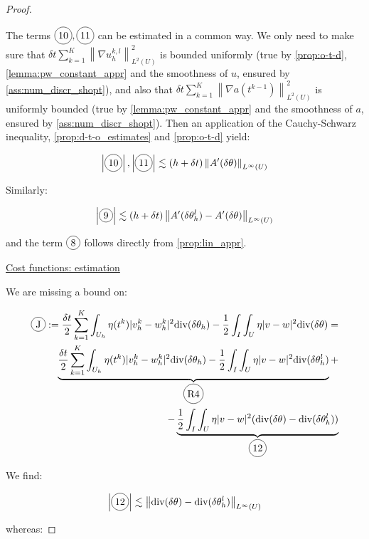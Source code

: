 \documentclass[english,a4paper,10pt,oneside]{scrbook}	%
\theoremstyle{break}
\newenvironment{mproof}[1][\proofname]{%
  \begin{proof}[#1]$ $\par\nobreak\ignorespaces
}{%
  \end{proof}
}
\renewcommand*{\proofname}{Proof}
\theoremstyle{remark}
\newcommand{\ds}{\displaystyle}
\newcommand{\norm}[1]{\left\lVert#1\right\rVert}
\newcommand{\te}{\theta}
\newcommand{\dive}{\text{div}}
\newcommand*\circled[1]{\tikz[baseline=(char.base)]{
            \node[shape=circle,draw,inner sep=2pt] (char) {#1};}}
\begin{document}
\begin{mproof}
The terms $\circled{10}, \circled{11}$ can be estimated in a common way. We only need to make sure that $\ds \delta t \sum_{k=1}^{K} \norm{\nabla u_h^{k,l}}_{L^2(U)}^2 $ is bounded uniformly (true by \cref{prop:o-t-d}, \cref{lemma:pw_constant_appr} and the smoothness of $u$, ensured by \cref{ass:num_discr_shopt}), and also that $\ds \delta t \sum_{k=1}^{K} \norm{\nabla a(t^{k-1})}_{L^2(U)}^2$ is uniformly bounded (true by \cref{lemma:pw_constant_appr} and the smoothness of $a$, ensured by \cref{ass:num_discr_shopt}). Then an application of the Cauchy-Schwarz inequality, \cref{prop:d-t-o_estimates} and \cref{prop:o-t-d} yield:

\begin{align*}
	\left | \circled{10} \right |, \left |\circled{11}\right | \lesssim (h+\delta t) \norm{A'(\delta \te)}_{L^\infty(U)}
\end{align*}

Similarly:

\begin{align*}
	\left | \circled{9} \right | \lesssim (h+\delta t) \norm{A'(\delta \te_h^l)-A'(\delta \te)}_{L^\infty(U)}
\end{align*}

and the term $\circled{8}$ follows directly from \cref{prop:lin_appr}.

\underline{Cost functions: estimation}

We are missing a bound on: 

\begin{align*}
	\circled{J}:=\frac{\delta t}{2} \sum_{k=1}^{K} \int_{U_h} \eta(t^k)|v_h^k-w_h^k|^2  \dive(\delta \theta_h ) - \frac{1}{2}\int_I\int_{U}\eta |v-w|^2\dive(\delta \te) = \\
	\underbrace{\frac{\delta t}{2} \sum_{k=1}^{K} \int_{U_h} \eta(t^k)|v_h^k-w_h^k|^2  \dive(\delta \theta_h ) - \frac{1}{2}\int_I\int_{U}\eta |v-w|^2\dive(\delta \te_h^l)}_{\circled{R4}}+\\
	-\underbrace{ \frac{1}{2}\int_I\int_{U}\eta |v-w|^2(\dive(\delta \te) - \dive(\delta \te_h^l))}_{\circled{12}}
\end{align*}

We find:

\begin{align*}
	\left | \circled{12} \right | \lesssim \norm{\dive(\delta \te) - \dive(\delta \te_h^l)}_{L^\infty(U)}
\end{align*}

whereas:


\end{mproof}
\end{document}
